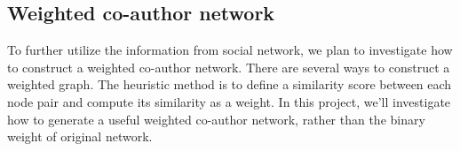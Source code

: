 \documentclass[12pt]{article}
\begin{document}



\subsection{Weighted co-author network}
To further utilize the information from social network, we plan to investigate how to construct a weighted co-author network.  There are several ways to construct a weighted graph.  The heuristic method is to define a similarity score between each node pair and compute its similarity as a weight.  In this project, we'll investigate how to generate a useful weighted co-author network, rather than the binary weight of original network.



\end{document}
